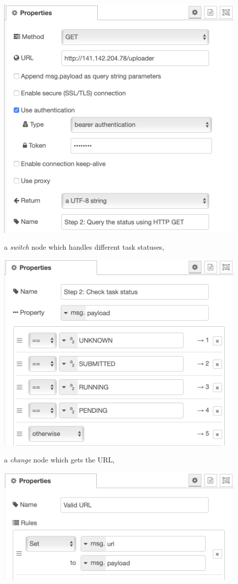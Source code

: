 \documentclass{mcmthesis}
\begin{document}
\begin{itemize}
\begin{center}
\includegraphics[width=12cm]{3_1.png}
\end{center}
a \textit{switch} node which handles different task statuses,
\begin{center}
\includegraphics[width=12cm]{3_2.png}
\end{center}
a \textit{change} node which gets the URL,
\begin{center}
\includegraphics[width=12cm]{3_3.png}

\end{center}
\end{itemize}
\end{document}
